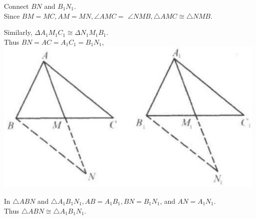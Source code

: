 \documentclass[10pt]{article}
\begin{document}
Connect \(B N\) and \(B_{1} N_{1}\).\\
Since \(B M=M C, A M=M N, \angle A M C=\) \(\angle N M B, \triangle A M C \cong \triangle N M B\).

Similarly, \(\Delta A_{1} M_{1} C_{1} \cong \Delta N_{1} M_{1} B_{1}\).\\
Thus \(B N=A C=A_{1} C_{1}=B_{1} N_{1}\),\\
\includegraphics[max width=\textwidth, center]{2025_04_17_97bc1f7e44d93c271a88g-031(1)}

In \(\triangle A B N\) and \(\triangle A_{1} B_{1} N_{1}, A B=A_{1} B_{1}, B N=B_{1} N_{1}\), and \(A N=A_{1} N_{1}\).\\
Thus \(\triangle A B N \cong \triangle A_{1} B_{1} N_{1}\).
\end{document}
